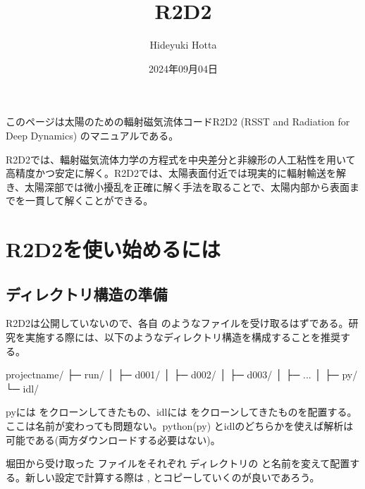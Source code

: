 \documentclass[letterpaper,10pt,dvipdfmx,report]{sphinxmanual}
\title{R2D2}
\date{2024年09月04日}
\author{Hideyuki Hotta}
\let\sphinxpxdimen\pdfpxdimen\else\newdimen\sphinxpxdimen
\begin{document}
\pagestyle{empty}
\sphinxmaketitle
\pagestyle{plain}
\sphinxtableofcontents
\pagestyle{normal}
\label{\detokenize{index::doc}}


\sphinxAtStartPar
このページは太陽のための輻射磁気流体コードR2D2 (RSST and Radiation for Deep Dynamics)
のマニュアルである。

\sphinxAtStartPar
{}

\sphinxAtStartPar
R2D2では、輻射磁気流体力学の方程式を中央差分と非線形の人工粘性を用いて高精度かつ安定に解く。R2D2では、太陽表面付近では現実的に輻射輸送を解き、太陽深部では微小擾乱を正確に解く手法を取ることで、太陽内部から表面までを一貫して解くことができる。

\noindent\sphinxincludegraphics[width=350\sphinxpxdimen]{{R2D2_logo_red}.png}

\sphinxstepscope


\chapter{R2D2を使い始めるには}
\label{\detokenize{start:r2d2}}\label{\detokenize{start::doc}}

\section{ディレクトリ構造の準備}
\label{\detokenize{start:id1}}
\sphinxAtStartPar
R2D2は公開していないので、各自  のようなファイルを受け取るはずである。研究を実施する際には、以下のようなディレクトリ構造を構成することを推奨する。

\begin{sphinxVerbatim}[commandchars=\\\{\}]
project\PYGZus{}name/
           ├─ run/
           │    ├─ d001/
           │    ├─ d002/
           │    ├─ d003/
           │    ├─ ...
           │
           ├─ py/
           └─ idl/
\end{sphinxVerbatim}

\sphinxAtStartPar
pyには  をクローンしてきたもの、idlには  をクローンしてきたものを配置する。ここは名前が変わっても問題ない。python(py) とidlのどちらかを使えば解析は可能である(両方ダウンロードする必要はない)。

\sphinxAtStartPar
堀田から受け取った  ファイルをそれぞれ  ディレクトリの  と名前を変えて配置する。新しい設定で計算する際は ,  とコピーしていくのが良いであろう。
\end{document}
